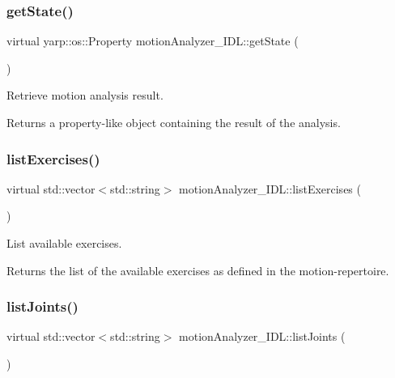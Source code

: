\subsubsection{\texorpdfstring{get\+State()}{getState()}}
{\footnotesize\ttfamily virtual yarp\+::os\+::\+Property motion\+Analyzer\+\_\+\+I\+D\+L\+::get\+State (\begin{DoxyParamCaption}{ }\end{DoxyParamCaption})\hspace{0.3cm}{\ttfamily [virtual]}}



Retrieve motion analysis result. 

\begin{DoxyReturn}{Returns}
a property-\/like object containing the result of the analysis. 
\end{DoxyReturn}
\mbox{\label{classmotionAnalyzer__IDL_ac62e7b2af278d353c3701d87aca8af2b}} 
\subsubsection{\texorpdfstring{list\+Exercises()}{listExercises()}}
{\footnotesize\ttfamily virtual std\+::vector$<$std\+::string$>$ motion\+Analyzer\+\_\+\+I\+D\+L\+::list\+Exercises (\begin{DoxyParamCaption}{ }\end{DoxyParamCaption})\hspace{0.3cm}{\ttfamily [virtual]}}



List available exercises. 

\begin{DoxyReturn}{Returns}
the list of the available exercises as defined in the motion-\/repertoire. 
\end{DoxyReturn}
\mbox{\label{classmotionAnalyzer__IDL_aaec274413bf24d3e213ce6cfb2592748}} 
\subsubsection{\texorpdfstring{list\+Joints()}{listJoints()}}
{\footnotesize\ttfamily virtual std\+::vector$<$std\+::string$>$ motion\+Analyzer\+\_\+\+I\+D\+L\+::list\+Joints (\begin{DoxyParamCaption}{ }\end{DoxyParamCaption})\hspace{0.3cm}{\ttfamily [virtual]}}



